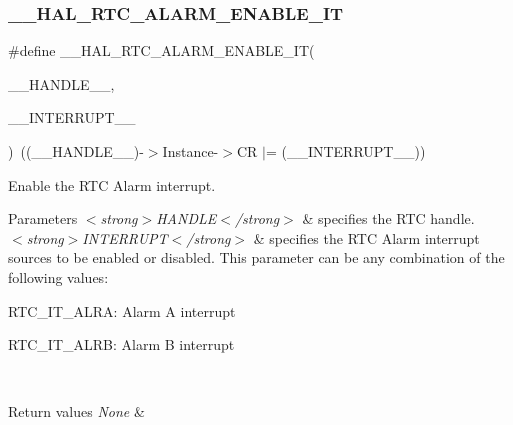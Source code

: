 \subsubsection{\texorpdfstring{\+\_\+\+\_\+\+H\+A\+L\+\_\+\+R\+T\+C\+\_\+\+A\+L\+A\+R\+M\+\_\+\+E\+N\+A\+B\+L\+E\+\_\+\+IT}{\_\_HAL\_RTC\_ALARM\_ENABLE\_IT}}
{\footnotesize\ttfamily \#define \+\_\+\+\_\+\+H\+A\+L\+\_\+\+R\+T\+C\+\_\+\+A\+L\+A\+R\+M\+\_\+\+E\+N\+A\+B\+L\+E\+\_\+\+IT(\begin{DoxyParamCaption}\item[{}]{\+\_\+\+\_\+\+H\+A\+N\+D\+L\+E\+\_\+\+\_\+,  }\item[{}]{\+\_\+\+\_\+\+I\+N\+T\+E\+R\+R\+U\+P\+T\+\_\+\+\_\+ }\end{DoxyParamCaption})~((\+\_\+\+\_\+\+H\+A\+N\+D\+L\+E\+\_\+\+\_\+)-\/$>$Instance-\/$>$CR $\vert$= (\+\_\+\+\_\+\+I\+N\+T\+E\+R\+R\+U\+P\+T\+\_\+\+\_\+))}



Enable the R\+TC Alarm interrupt. 


\begin{DoxyParams}{Parameters}
{\em $<$strong$>$\+H\+A\+N\+D\+L\+E$<$/strong$>$} & specifies the R\+TC handle. \\
\hline
{\em $<$strong$>$\+I\+N\+T\+E\+R\+R\+U\+P\+T$<$/strong$>$} & specifies the R\+TC Alarm interrupt sources to be enabled or disabled. This parameter can be any combination of the following values\+: \begin{DoxyItemize}
\item R\+T\+C\+\_\+\+I\+T\+\_\+\+A\+L\+RA\+: Alarm A interrupt \item R\+T\+C\+\_\+\+I\+T\+\_\+\+A\+L\+RB\+: Alarm B interrupt \end{DoxyItemize}
\\
\hline
\end{DoxyParams}

\begin{DoxyRetVals}{Return values}
{\em None} & \\
\hline
\end{DoxyRetVals}
\mbox{\label{group___r_t_c___exported___macros_ga7da963373beb744413c1e3302eb91bae}} 
